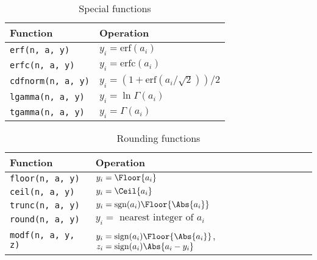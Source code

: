\begin{table}
  \begin{tabularx}{\textwidth}{LL}
    \toprule
    Function & Operation \\
    \midrule
    \texttt{erf(n, a, y)}     & $y_i = \mathrm{erf}(a_i)$  \\
    \texttt{erfc(n, a, y)}    & $y_i = \mathrm{erfc}(a_i)$ \\
    \texttt{cdfnorm(n, a, y)}
    & $y_i = (1 + \mathrm{erf}(a_i / \sqrt{2})) / 2$ \\
    \texttt{lgamma(n, a, y)}  & $y_i = \ln\Gamma(a_i)$     \\
    \texttt{tgamma(n, a, y)}  & $y_i = \Gamma(a_i)$        \\
    \bottomrule
  \end{tabularx}
  \caption{Special functions}
  \label{tab:Special functions}
\end{table}

\begin{table}
  \begin{tabularx}{\textwidth}{LL}
    \toprule
    Function & Operation \\
    \midrule
    \texttt{floor(n, a, y)} & $y_i = \Floor{a_i}$                        \\
    \texttt{ceil(n, a, y)}  & $y_i = \Ceil{a_i}$                         \\
    \texttt{trunc(n, a, y)} & $y_i = \mathrm{sgn}(a_i)\Floor{\Abs{a_i}}$ \\
    \texttt{round(n, a, y)} & $y_i = \text{ nearest integer of }a_i$     \\
    \texttt{modf(n, a, y, z)} &
    $y_i = \mathrm{sign}(a_i)\Floor{\Abs{a_i}}$,
    $z_i = \mathrm{sign}(a_i)\Abs{a_i - y_i}$ \\
    \bottomrule
  \end{tabularx}
  \caption{Rounding functions}
  \label{tab:Rounding functions}
\end{table}

\clearpage
